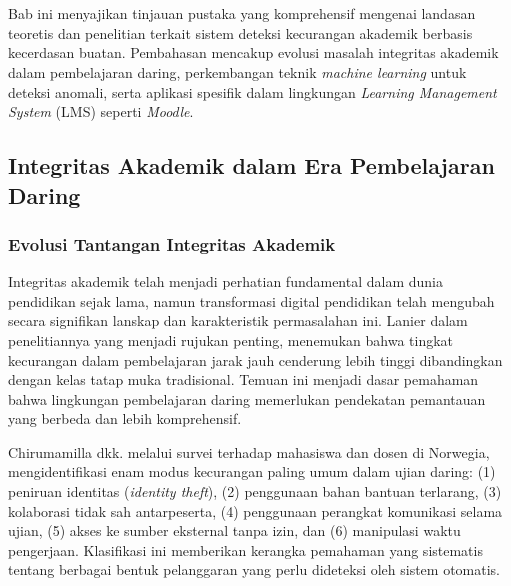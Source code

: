 \chapter{\babDua}
\label{bab:2}

Bab ini menyajikan tinjauan pustaka yang komprehensif mengenai landasan teoretis dan penelitian terkait sistem deteksi kecurangan akademik berbasis kecerdasan buatan. Pembahasan mencakup evolusi masalah integritas akademik dalam pembelajaran daring, perkembangan teknik \textit{machine learning} untuk deteksi anomali, serta aplikasi spesifik dalam lingkungan \textit{Learning Management System} (LMS) seperti \textit{Moodle}.

\section{Integritas Akademik dalam Era Pembelajaran Daring}
\label{sec:integritasAkademik}

\subsection{Evolusi Tantangan Integritas Akademik}
\label{subsec:evolusiTantangan}

Integritas akademik telah menjadi perhatian fundamental dalam dunia pendidikan sejak lama, namun transformasi digital pendidikan telah mengubah secara signifikan lanskap dan karakteristik permasalahan ini. Lanier \cite{Lanier2006} dalam penelitiannya yang menjadi rujukan penting, menemukan bahwa tingkat kecurangan dalam pembelajaran jarak jauh cenderung lebih tinggi dibandingkan dengan kelas tatap muka tradisional. Temuan ini menjadi dasar pemahaman bahwa lingkungan pembelajaran daring memerlukan pendekatan pemantauan yang berbeda dan lebih komprehensif.

Chirumamilla dkk. \cite{Chirumamilla2020} melalui survei terhadap mahasiswa dan dosen di Norwegia, mengidentifikasi enam modus kecurangan paling umum dalam ujian daring: (1) peniruan identitas (\textit{identity theft}), (2) penggunaan bahan bantuan terlarang, (3) kolaborasi tidak sah antarpeserta, (4) penggunaan perangkat komunikasi selama ujian, (5) akses ke sumber eksternal tanpa izin, dan (6) manipulasi waktu pengerjaan. Klasifikasi ini memberikan kerangka pemahaman yang sistematis tentang berbagai bentuk pelanggaran yang perlu dideteksi oleh sistem otomatis.


